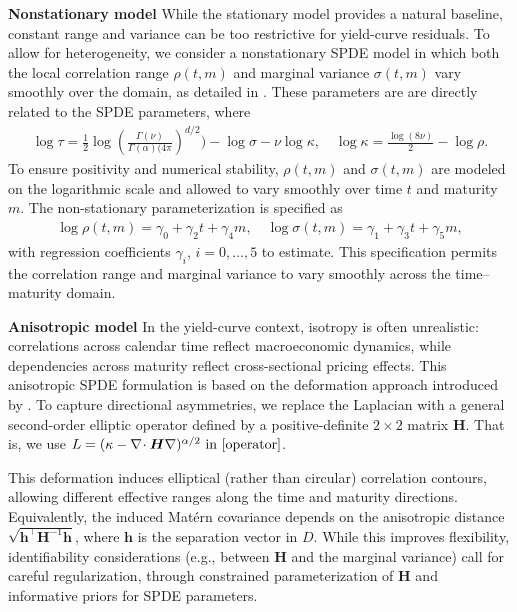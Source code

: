 \documentclass[
  12pt]{article}
\begin{document}
\textbf{Nonstationary model}
While the stationary model provides a natural baseline, constant range and variance can be too restrictive for yield-curve residuals. To allow for heterogeneity, we consider a nonstationary SPDE model in which both the local correlation range $\rho(t,m)$ and marginal variance $\sigma(t,m)$ vary smoothly over the domain, as detailed in \cite{lindgren2015bayesian}. These parameters are are directly related to the SPDE parameters, where \begin{align*}
    \log \tau = \frac{1}{2} \log(\frac{\Gamma(\nu)}{\Gamma(\alpha)(4\pi})^{d/2}) - \log \sigma - \nu \log \kappa, \quad \log \kappa = \frac{\log(8\nu)}{2} - \log \rho.
\end{align*}  To ensure positivity and numerical stability, $\rho(t,m)$ and  $\sigma(t,m)$ are modeled on the logarithmic scale and allowed to vary smoothly over time $t$ and maturity $m$. The non-stationary parameterization is specified as
\begin{align*}
\log \rho(t,m) = \gamma_0 + \gamma_2 t + \gamma_4 m, \quad
\log \sigma(t,m) = \gamma_1 + \gamma_3 t + \gamma_5 m,
\end{align*}
with regression coefficients $\gamma_i$, $i=0,\ldots,5$ to estimate. This specification permits the correlation range and marginal variance to vary smoothly across the time–maturity domain.

\textbf{Anisotropic model}
In the yield-curve context, isotropy is often unrealistic: correlations across calendar time reflect macroeconomic dynamics, while dependencies across maturity reflect cross-sectional pricing effects. This anisotropic SPDE formulation is based on the deformation approach introduced by \cite{fuglstad2015exploring}. To capture directional asymmetries, we replace the Laplacian with a general second-order elliptic operator defined by a positive-definite $2\times2$ matrix $\boldsymbol{H}$. That is, we use $L = (\kappa - \nabla\!\cdot \boldsymbol{H} \nabla)^{\alpha/2} \ \hbox{in} \ \eqref{operator}$.

This deformation induces elliptical (rather than circular) correlation contours, allowing different effective ranges along the time and maturity directions. Equivalently, the induced Matérn covariance depends on the anisotropic distance $\sqrt{\boldsymbol{h}^\top \boldsymbol{H}^{-1}\boldsymbol{h}}$, where $\boldsymbol{h}$ is the separation vector in $D$. While this improves flexibility, identifiability considerations (e.g., between $\boldsymbol{H}$ and the marginal variance) call for careful regularization, through constrained parameterization of $\boldsymbol{H}$ and informative priors for SPDE parameters.
\end{document}
